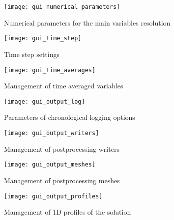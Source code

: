 {{{\begin{figure}[!ht]
\begin{center}
\texttt{[image: gui\_numerical\_parameters]}
\caption{Numerical parameters for the main variables resolution}
\label{fig:gui_numerical_parameters}
\end{center}
\end{figure}

\begin{figure}[!ht]
\begin{center}
\texttt{[image: gui\_time\_step]}
\caption{Time step settings}
\label{fig:gui_time_step}
\end{center}
\end{figure}

\begin{figure}[!ht]
\begin{center}
\texttt{[image: gui\_time\_averages]}
\caption{Management of time averaged variables}
\label{fig:gui_time_averages}
\end{center}
\end{figure}

\begin{figure}[!ht]
\begin{center}
\texttt{[image: gui\_output\_log]}
\caption{Parameters of chronological logging options}
\label{fig:gui_output_log}
\end{center}
\end{figure}

\begin{figure}[!ht]
\begin{center}
\texttt{[image: gui\_output\_writers]}
\caption{Management of postprocessing writers}
\label{fig:gui_output_writers}
\end{center}
\end{figure}

\begin{figure}[!ht]
\begin{center}
\texttt{[image: gui\_output\_meshes]}
\caption{Management of postprocessing meshes}
\label{fig:gui_output_meshes}
\end{center}
\end{figure}

\begin{figure}[!ht]
\begin{center}
\texttt{[image: gui\_output\_profiles]}
\caption{Management of 1D profiles of the solution}
\label{fig:gui_output_profiles}
\end{center}
\end{figure}

}}}
